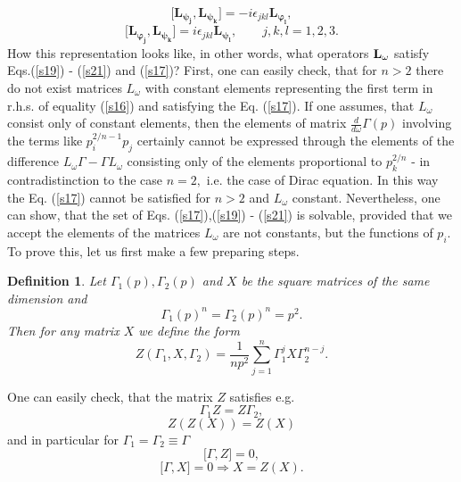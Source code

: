 \documentclass[a4paper,a4paper]{article}
\newtheorem{definition}[theorem]{Definition}
\begin{document}
\begin{equation}
\lbrack \mathbf{L_{\psi _{j}}},\mathbf{L_{\psi _{k}}}]=-i\epsilon _{jkl}%
\mathbf{L_{\varphi _{l}},}  \label{s20}
\end{equation}%
\begin{equation}
\lbrack \mathbf{L_{\varphi _{j}}},\mathbf{L_{\psi _{k}}}]=i\epsilon _{jkl}%
\mathbf{L_{\psi _{l}},\qquad }j,k,l=1,2,3.  \label{s21}
\end{equation}%
How this representation looks like, in other words, what operators $\mathbf{%
L_{\omega }}$ satisfy Eqs.(\ref{s19}) - (\ref{s21}) and (\ref{s17})? First,
one can easily check, that for $n>2$ there do not exist matrices $L_{\omega
} $ with constant elements representing the first term in r.h.s. of equality
(\ref{s16}) and satisfying the Eq. (\ref{s17}). If one assumes, that $%
L_{\omega }$ consist only of constant elements, then the elements of matrix $%
\frac{d}{d\omega }\Gamma (p)$ involving the terms like $p_{i}^{2/n-1}p_{j}$
certainly cannot be expressed through the elements of the difference $%
L_{\omega }\Gamma -\Gamma L_{\omega }$ consisting only of the elements
proportional to $p_{k}^{2/n}$ - in contradistinction to the case $n=2,$ i.e.
the case of Dirac equation. In this way the Eq. (\ref{s17}) cannot be
satisfied for $n>2$ and $L_{\omega }$ constant. Nevertheless, one can show,
that the set of Eqs. (\ref{s17}),(\ref{s19}) - (\ref{s21}) is solvable,
provided that we accept the elements of the matrices $L_{\omega }$ are not
constants, but the functions of $p_{i}$. To prove this, let us first make a
few preparing steps.

\begin{definition}
Let $\Gamma _{1}(p),\Gamma _{2}(p)$ and $X$ be the square matrices of the
same dimension and%
\begin{equation*}
\Gamma _{1}(p)^{n}=\Gamma _{2}(p)^{n}=p^{2}.
\end{equation*}
Then for any matrix $X$ we define the form 
\begin{equation}
Z(\Gamma _{1},X,\Gamma _{2})=\frac{1}{np^{2}}\sum_{j=1}^{n}\Gamma
_{1}^{j}X\Gamma _{2}^{n-j}.  \label{s22}
\end{equation}
\end{definition}

\noindent One can easily check, that the matrix $Z$ satisfies e.g. 
\begin{equation}
\Gamma _{1}Z=Z\Gamma _{2},  \label{s23}
\end{equation}%
\begin{equation}
Z(Z(X))=Z(X)  \label{s24}
\end{equation}%
and in particular for $\Gamma _{1}=\Gamma _{2}\equiv \Gamma $%
\begin{equation}
\lbrack \Gamma ,Z]=0,  \label{s25}
\end{equation}%
\begin{equation}
\lbrack \Gamma ,X]=0\Rightarrow X=Z(X).  \label{sa25}
\end{equation}
\end{document}
